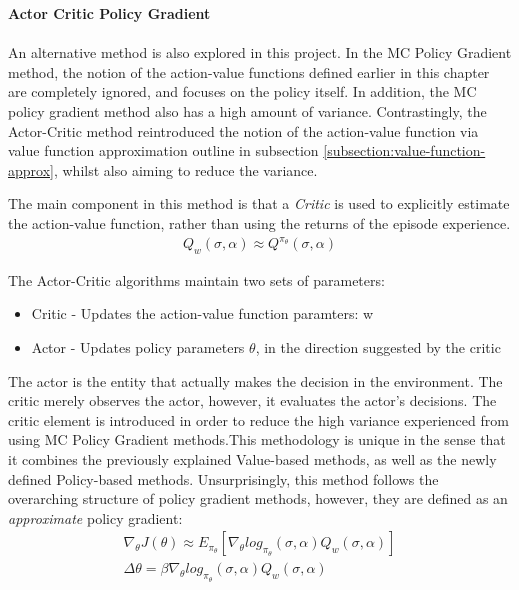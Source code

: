 \documentclass[ %
                    author={Ashwinder Khurana},
                supervisor={Prof Dave Cliff},
                    degree={MEng},
                     title={The Deeply Reinforced Trader},
                  subtitle={},
                      type={enterprise},
                      year={2020} ]{dissertation}
\begin{document}
{\noindent
\textbf{Actor Critic Policy Gradient}
\\
\\
\noindent 
An alternative method is also explored in this project. In the MC Policy Gradient method, the notion of the action-value functions defined earlier in this chapter are completely ignored, and focuses on the policy itself. In addition, the MC policy gradient method also has a high amount of variance.  Contrastingly, the Actor-Critic method reintroduced the notion of the action-value function via value function approximation outline in subsection \ref{subsection:value-function-approx}, whilst also aiming to reduce the variance.

The main component in this method is that a \textit{Critic} is used to explicitly estimate the action-value function, rather than using the returns of the episode experience.
\begin{equation}
\begin{split}
Q_w(\sigma,\alpha) \approx Q^{\pi_{\theta}} (\sigma, \alpha)
\end{split}
\end{equation}

The Actor-Critic algorithms maintain two sets of parameters:
\begin{itemize}
\item Critic - Updates the action-value function paramters: w
\item Actor - Updates policy parameters $\theta$, in the direction suggested by the critic
\end{itemize}

\noindent
The actor is the entity that actually makes the decision in the environment. The critic merely observes the actor, however, it evaluates the actor's decisions. 
The critic element is introduced in order to reduce the high variance experienced from using MC Policy Gradient methods.This methodology is unique in the sense that it combines the previously explained Value-based methods, as well as the newly defined Policy-based methods.  Unsurprisingly, this method follows the overarching structure of policy gradient methods, however, they are defined as an \textit{approximate} policy gradient:
\begin{equation}
\begin{split}
\nabla_\theta J(\theta) \approx E_{\pi_{\theta}} [\nabla_\theta log_{\pi_{\theta}}(\sigma,\alpha) Q_w(\sigma, \alpha)]\\
\Delta \theta = \beta \nabla_\theta log_{\pi_{\theta}}(\sigma,\alpha) Q_w(\sigma, \alpha)
\end{split}
\end{equation}

}
\end{document}
